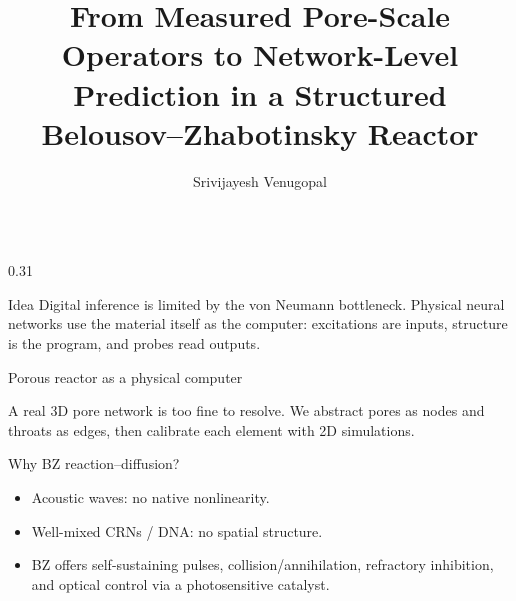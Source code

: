 \documentclass[final,hyperref={pdfpagelabels=false}]{beamer}
\title{From Measured Pore-Scale Operators to Network-Level Prediction in a Structured Belousov--Zhabotinsky Reactor}
\author{Srivijayesh Venugopal}
\institute{Supervisor: Prof. Weisi Guo\\Cranfield University, MSc Computational Fluid Dynamics}
\begin{document}
\begin{frame}[t]{}

\begin{columns}[T]

\begin{column}{0.31\paperwidth}

\begin{block}{Idea}
Digital inference is limited by the von Neumann bottleneck. Physical neural networks use the material itself as the computer: excitations are inputs, structure is the program, and probes read outputs.
\end{block}

\begin{block}{Porous reactor as a physical computer}
\centering
{}

\vspace{0.3cm}
A real 3D pore network is too fine to resolve. We abstract pores as nodes and throats as edges, then calibrate each element with 2D simulations.
\end{block}

\begin{block}{Why BZ reaction--diffusion?}
\begin{itemize}
\item Acoustic waves: no native nonlinearity.
\item Well-mixed CRNs / DNA: no spatial structure.
\item BZ offers self-sustaining pulses, collision/annihilation, refractory inhibition, and optical control via a photosensitive catalyst.
\end{itemize}
\end{block}


\end{column}
\end{columns}
\end{frame}
\end{document}
